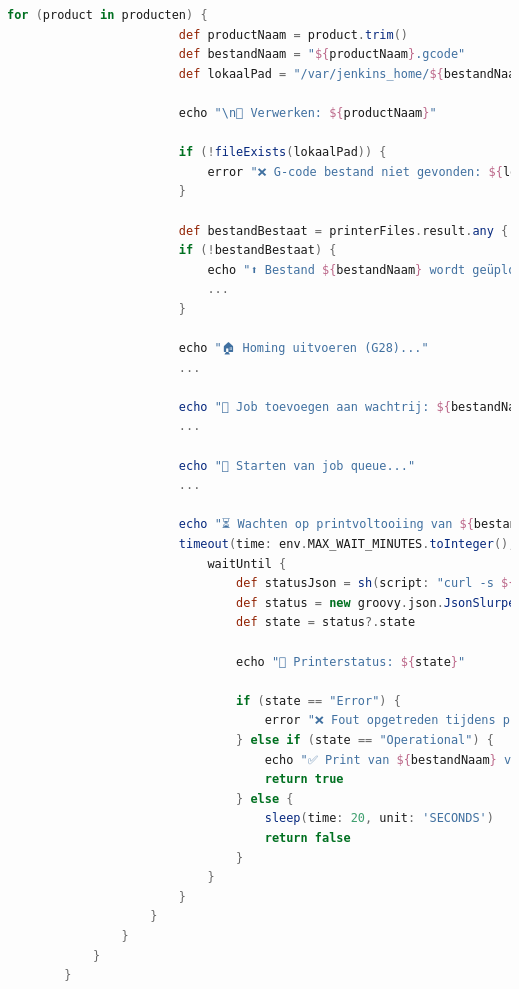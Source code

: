 \begin{enumerate}
\begin{itemize}
\begin{lstlisting}[language=groovy, caption=Sequentiële verwerking per product]
                    for (product in producten) {
                        def productNaam = product.trim()
                        def bestandNaam = "${productNaam}.gcode"
                        def lokaalPad = "/var/jenkins_home/${bestandNaam}"
                        
                        echo "\n🔧 Verwerken: ${productNaam}"
                        
                        if (!fileExists(lokaalPad)) {
                            error "❌ G-code bestand niet gevonden: ${lokaalPad}"
                        }
                        
                        def bestandBestaat = printerFiles.result.any { it.path == bestandNaam }
                        if (!bestandBestaat) {
                            echo "⬆️ Bestand ${bestandNaam} wordt geüpload..."
                            ...
                        }
                        
                        echo "🏠 Homing uitvoeren (G28)..."
                        ...
                        
                        echo "📨 Job toevoegen aan wachtrij: ${bestandNaam}"
                        ...
                        
                        echo "🚦 Starten van job queue..."
                        ...
                        
                        echo "⏳ Wachten op printvoltooiing van ${bestandNaam}..."
                        timeout(time: env.MAX_WAIT_MINUTES.toInteger(), unit: 'MINUTES') {
                            waitUntil {
                                def statusJson = sh(script: "curl -s ${env.PRINTER_URL}/api/job", returnStdout: true).trim()
                                def status = new groovy.json.JsonSlurperClassic().parseText(statusJson)
                                def state = status?.state
                                
                                echo "📡 Printerstatus: ${state}"
                                
                                if (state == "Error") {
                                    error "❌ Fout opgetreden tijdens printen!"
                                } else if (state == "Operational") {
                                    echo "✅ Print van ${bestandNaam} voltooid."
                                    return true
                                } else {
                                    sleep(time: 20, unit: 'SECONDS')
                                    return false
                                }
                            }
                        }
                    }
                }
            }
        }
    \end{lstlisting}
    

\end{itemize}
\end{enumerate}
